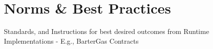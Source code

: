 \documentclass[../alan-handbook.tex]{subfiles}
\begin{document}
\section{Norms \& Best Practices} \label{Norms}

Standards, and Instructions for best desired outcomes from Runtime Implementations - E.g., BarterGas Contracts 
\end{document}

